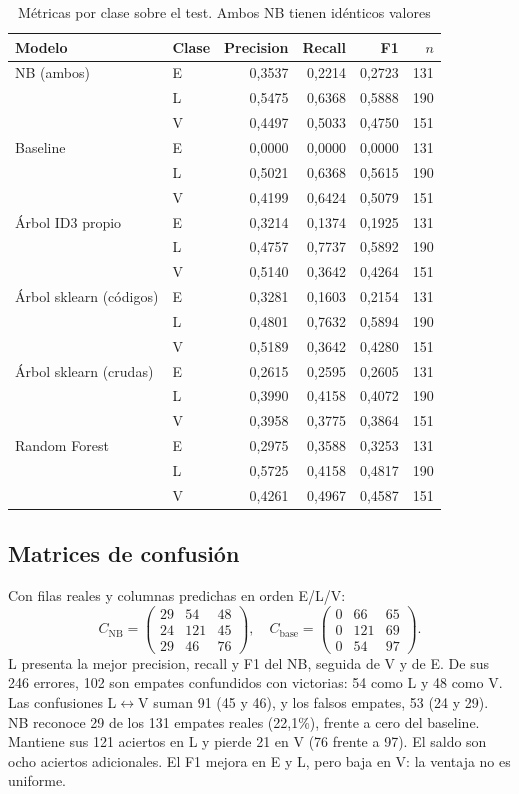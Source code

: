 \documentclass[conference]{IEEEtran}
\begin{document}
\begin{table}[htbp]
\caption{Métricas por clase sobre el test. Ambos NB tienen idénticos valores}
\label{tab:clases}
\centering
\begin{tabular}{llrrrr}
\hline
Modelo & Clase & Precision & Recall & F1 & $n$ \\
\hline
NB (ambos) & E & 0,3537 & 0,2214 & 0,2723 & 131 \\
 & L & 0,5475 & 0,6368 & 0,5888 & 190 \\
 & V & 0,4497 & 0,5033 & 0,4750 & 151 \\
Baseline & E & 0,0000 & 0,0000 & 0,0000 & 131 \\
 & L & 0,5021 & 0,6368 & 0,5615 & 190 \\
 & V & 0,4199 & 0,6424 & 0,5079 & 151 \\
Árbol ID3 propio & E & 0,3214 & 0,1374 & 0,1925 & 131 \\
 & L & 0,4757 & 0,7737 & 0,5892 & 190 \\
 & V & 0,5140 & 0,3642 & 0,4264 & 151 \\
Árbol sklearn (códigos) & E & 0,3281 & 0,1603 & 0,2154 & 131 \\
 & L & 0,4801 & 0,7632 & 0,5894 & 190 \\
 & V & 0,5189 & 0,3642 & 0,4280 & 151 \\
Árbol sklearn (crudas) & E & 0,2615 & 0,2595 & 0,2605 & 131 \\
 & L & 0,3990 & 0,4158 & 0,4072 & 190 \\
 & V & 0,3958 & 0,3775 & 0,3864 & 151 \\
Random Forest & E & 0,2975 & 0,3588 & 0,3253 & 131 \\
 & L & 0,5725 & 0,4158 & 0,4817 & 190 \\
 & V & 0,4261 & 0,4967 & 0,4587 & 151 \\
\hline
\end{tabular}
\end{table}

\subsection{Matrices de confusión}
Con filas reales y columnas predichas en orden E/L/V:
\[
C_{\mathrm{NB}}=
\begin{pmatrix}29&54&48\\24&121&45\\29&46&76\end{pmatrix},
\quad
C_{\mathrm{base}}=
\begin{pmatrix}0&66&65\\0&121&69\\0&54&97\end{pmatrix}.
\]
L presenta la mejor precision, recall y F1 del NB, seguida de V y de E. De sus 246 errores, 102 son empates confundidos con victorias: 54 como L y 48 como V. Las confusiones L$\leftrightarrow$V suman 91 (45 y 46), y los falsos empates, 53 (24 y 29). NB reconoce 29 de los 131 empates reales (22,1\%), frente a cero del baseline. Mantiene sus 121 aciertos en L y pierde 21 en V (76 frente a 97). El saldo son ocho aciertos adicionales. El F1 mejora en E y L, pero baja en V: la ventaja no es uniforme.
\end{document}
